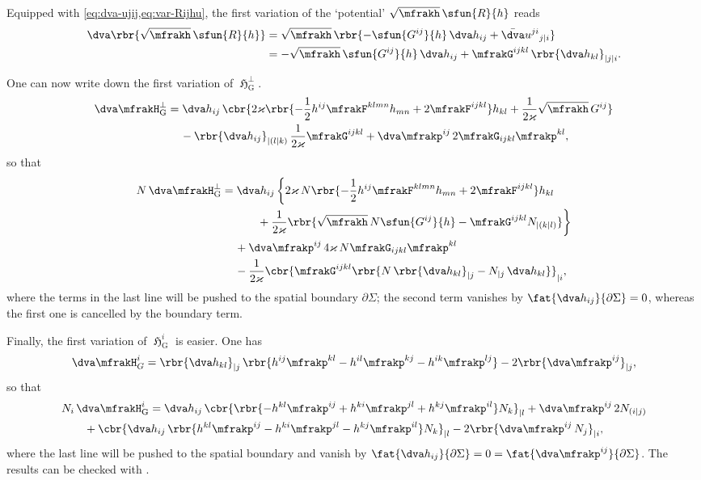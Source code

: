 \documentclass[a4paper,11pt]{article}
\begin{document}
Equipped with \cref{eq:dva-ujij,eq:var-Rijhu}, the first variation of the 
`potential' 
$\sqrt{\mfrakh}\,\sfun{R}{h}$ reads
\begin{align}
\dva\rbr{\sqrt{\mfrakh}\,\sfun{R}{h}} &= \sqrt{\mfrakh}\,
\rbr{-\sfun{G^{ij}}{h}\,\dva h_{ij} +
\bar{\dva}u^{ji}{}_{j|i}}
\\
&= -\sqrt{\mfrakh}\,\sfun{G^{ij}}{h}\,\dva h_{ij} +
\mfrakG^{ijkl}\,\rbr{\dva h_{kl}}_{|j|i}.
\end{align}

One can now write down the first variation of $\mfrakH_\text{G}^\perp$.
\begin{align}
\dva \mfrakH_\text{G}^\perp &= 
\dva h_{ij}\,\cbr{2\varkappa \rbr{-\frac{1}{2} h^{ij} \mfrakF^{klmn} h_{mn} + 
2 \mfrakF^{ijkl}}h_{kl} + \frac{1}{2\varkappa} \sqrt{\mfrakh}\,G^{ij}}
\nonumber \\
&\quad\,
-\rbr{\dva h_{ij}}_{|(l|k)}\,\frac{1}{2\varkappa} \mfrakG^{ijkl}
+\dva \mfrakp^{ij}\,2\mfrakG_{ijkl}\mfrakp^{kl},
\end{align}
so that
\begin{align}
N\,\dva \mfrakH_\text{G}^\perp &= \dva h_{ij}\,\bigg\{
2\varkappa\,N\rbr{ -\frac{1}{2}h^{ij} \mfrakF^{klmn} h_{mn}
+ 2 \mfrakF^{ijkl}} h_{kl}
\nonumber \\
&\quad\,\qquad
+\frac{1}{2\varkappa}
\rbr{ \sqrt{\mfrakh}\,N\sfun{G^{ij}}{h}
-\mfrakG^{ijkl}N_{|(k|l)}}\bigg\}
\nonumber \\
&\quad\,
+\dva \mfrakp^{ij}\,4\varkappa\,N\mfrakG_{ijkl}\mfrakp^{kl}
\nonumber \\
&\quad\,
-\frac{1}{2\varkappa}
\cbr{\mfrakG^{ijkl}
\rbr{N\,\rbr{\dva h_{kl}}_{|j} - N_{|j}\,\dva h_{kl}} }_{|i},
\end{align}
where the terms in the last line will be pushed to the spatial boundary
$\partial\Sigma$; the second term vanishes by $\fat{\dva 
h_{ij}}{\partial\Sigma} 
= 0$, whereas the first one is cancelled by the boundary term.

Finally, the first variation of $\mfrakH_\text{G}^i$ is easier. One has
\begin{align}
\dva \mfrakH_G^i = \rbr{\dva h_{kl}}_{|j}\,
\rbr{h^{ij}\mfrakp^{kl} - h^{il}\mfrakp^{kj} - h^{ik}\mfrakp^{lj}}
-2\rbr{\dva \mfrakp^{ij}}_{|j},
\end{align}
so that
\begin{align}
&
N_i\,\dva \mfrakH_\text{G}^i = \dva h_{ij}\,\cbr{\rbr{
-h^{kl}\mfrakp^{ij} + h^{ki}\mfrakp^{jl} + h^{kj}\mfrakp^{il}} N_k}_{|l}
+\dva \mfrakp^{ij}\,2N_{(i|j)}
\nonumber \\
&\qquad
+\cbr{\dva h_{ij}\,\rbr{
h^{kl}\mfrakp^{ij} - h^{ki}\mfrakp^{jl} - h^{kj}\mfrakp^{il}} N_k}_{|l}
- 2\rbr{\dva \mfrakp^{ij}\,N_{j}}_{|i},
\end{align}
where the last line will be pushed to the spatial boundary and vanish by
$\fat{\dva h_{ij}}{\partial\Sigma} = 0 =
\fat{\dva \mfrakp^{ij}}{\partial\Sigma}$. The results can be checked with 
\cite[ch.\ 4.2.7]{Poisson2004}.
\end{document}

